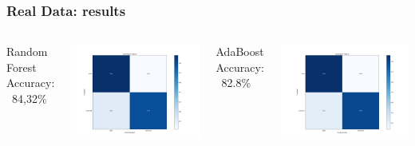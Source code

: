 \begin{frame}[fragile] %
    \frametitle{Real Data: results}
 
\begin{columns}[c] %
    Random Forest
    \newline Accuracy: ~84,32\%
    \begin{center}		
		\includegraphics[height=0.3\textheight]{images/confusion_matrix_random_forest.png}
	\end{center}
    
    AdaBoost
    \newline Accuracy: ~82.8\%
	\begin{center}		
		\includegraphics[height=0.3\textheight]{images/confusion_matrix_adaboost.png}
	\end{center}
	

\end{columns}
\end{frame}
